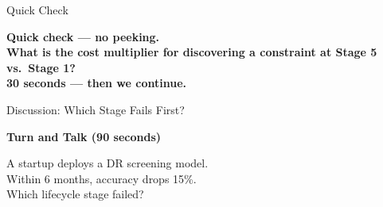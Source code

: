 \documentclass[aspectratio=169, 12pt]{beamer}
\begin{document}
\begin{frame}{Quick Check}
\note{
%
}

\centering
\Large\bfseries Quick check --- no peeking.\\[0.5cm]
\normalsize What is the cost multiplier for discovering a constraint at Stage 5 vs.\ Stage 1?\\[0.3cm]
{\small 30 seconds --- then we continue.}
\end{frame}



\begin{frame}{Discussion: Which Stage Fails First?}
\note{
%
%
%
%
}

\centering
\vspace{0.5cm}
{\large\bfseries Turn and Talk \textcolor{midgray}{(90 seconds)}}

\vspace{0.4cm}
{\large A startup deploys a DR screening model.\\
Within 6 months, accuracy drops 15\%.\\[0.2cm]
\alert{Which lifecycle stage failed?}}


\end{frame}
\end{document}
